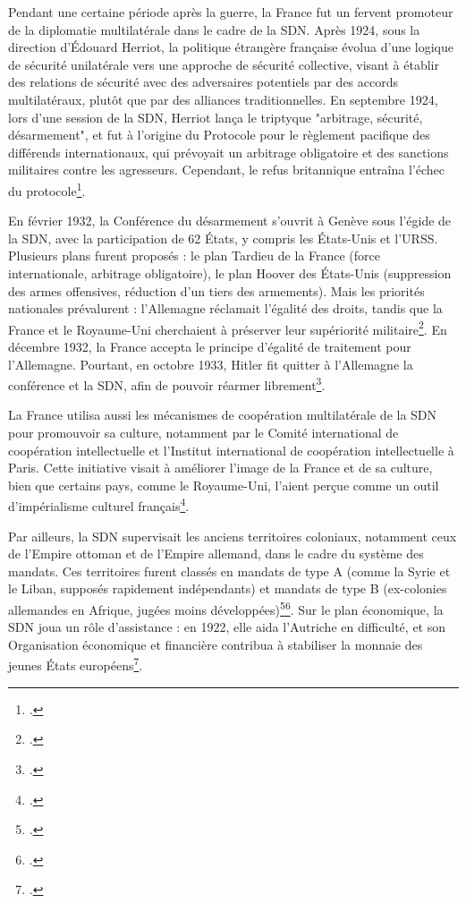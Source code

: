 \documentclass[a4paper,twoside,12pt]{book}
\begin{document}
Pendant une certaine période après la guerre, la France fut un fervent promoteur de la diplomatie multilatérale dans le cadre de la SDN. Après 1924, sous la direction d'Édouard Herriot, la politique étrangère française évolua d'une logique de sécurité unilatérale vers une approche de sécurité collective, visant à établir des relations de sécurité avec des adversaires potentiels par des accords multilatéraux, plutôt que par des alliances traditionnelles. En septembre 1924, lors d'une session de la SDN, Herriot lança le triptyque "arbitrage, sécurité, désarmement", et fut à l'origine du Protocole pour le règlement pacifique des différends internationaux, qui prévoyait un arbitrage obligatoire et des sanctions militaires contre les agresseurs. Cependant, le refus britannique entraîna l'échec du protocole\footcite[p.455]{guieu2016}.

En février 1932, la Conférence du désarmement s'ouvrit à Genève sous l'égide de la SDN, avec la participation de 62 États, y compris les États-Unis et l'URSS. Plusieurs plans furent proposés : le plan Tardieu de la France (force internationale, arbitrage obligatoire), le plan Hoover des États-Unis (suppression des armes offensives, réduction d'un tiers des armements). Mais les priorités nationales prévalurent : l'Allemagne réclamait l'égalité des droits, tandis que la France et le Royaume-Uni cherchaient à préserver leur supériorité militaire\footcite[p.142]{milza2019}. En décembre 1932, la France accepta le principe d'égalité de traitement pour l'Allemagne. Pourtant, en octobre 1933, Hitler fit quitter à l'Allemagne la conférence et la SDN, afin de pouvoir réarmer librement\footcite[p.146-147]{milza2019}.

La France utilisa aussi les mécanismes de coopération multilatérale de la SDN pour promouvoir sa culture, notamment par le Comité international de coopération intellectuelle et l'Institut international de coopération intellectuelle à Paris. Cette initiative visait à améliorer l'image de la France et de sa culture, bien que certains pays, comme le Royaume-Uni, l'aient perçue comme un outil d'impérialisme culturel français\footcite[p.411]{guieu2016}.

Par ailleurs, la SDN supervisait les anciens territoires coloniaux, notamment ceux de l'Empire ottoman et de l'Empire allemand, dans le cadre du système des mandats. Ces territoires furent classés en mandats de type A (comme la Syrie et le Liban, supposés rapidement indépendants) et mandats de type B (ex-colonies allemandes en Afrique, jugées moins développées)\footcite[p.80]{montero2001}\footcite[p.286-287]{guieu2016}. Sur le plan économique, la SDN joua un rôle d'assistance : en 1922, elle aida l'Autriche en difficulté, et son Organisation économique et financière contribua à stabiliser la monnaie des jeunes États européens\footcite[p.43]{milza2019}. 
\end{document}
